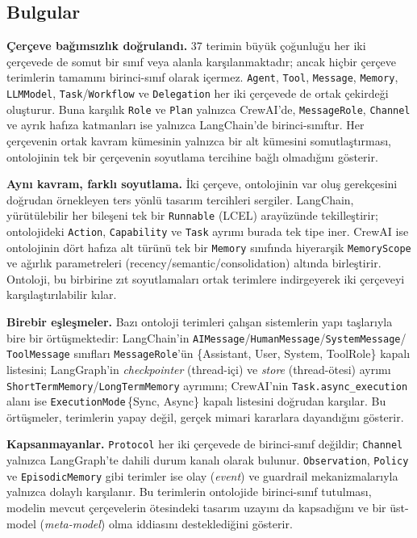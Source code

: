 \documentclass[10pt, a4paper, twocolumn]{article}
\begin{document}
\subsection*{Bulgular}

\textbf{Çerçeve bağımsızlık doğrulandı.} 37 terimin büyük çoğunluğu her iki çerçevede de somut bir sınıf veya alanla karşılanmaktadır; ancak hiçbir çerçeve terimlerin tamamını birinci-sınıf olarak içermez. \texttt{Agent}, \texttt{Tool}, \texttt{Message}, \texttt{Memory}, \texttt{LLMModel}, \texttt{Task}/\texttt{Workflow} ve \texttt{Delegation} her iki çerçevede de ortak çekirdeği oluşturur. Buna karşılık \texttt{Role} ve \texttt{Plan} yalnızca CrewAI'de, \texttt{MessageRole}, \texttt{Channel} ve ayrık hafıza katmanları ise yalnızca LangChain'de birinci-sınıftır. Her çerçevenin ortak kavram kümesinin yalnızca bir alt kümesini somutlaştırması, ontolojinin tek bir çerçevenin soyutlama tercihine bağlı olmadığını gösterir.

\textbf{Aynı kavram, farklı soyutlama.} İki çerçeve, ontolojinin var oluş gerekçesini doğrudan örnekleyen ters yönlü tasarım tercihleri sergiler. LangChain, yürütülebilir her bileşeni tek bir \texttt{Runnable} (LCEL) arayüzünde tekilleştirir; ontolojideki \texttt{Action}, \texttt{Capability} ve \texttt{Task} ayrımı burada tek tipe iner. CrewAI ise ontolojinin dört hafıza alt türünü tek bir \texttt{Memory} sınıfında hiyerarşik \texttt{MemoryScope} ve ağırlık parametreleri (recency/semantic/consolidation) altında birleştirir. Ontoloji, bu birbirine zıt soyutlamaları ortak terimlere indirgeyerek iki çerçeveyi karşılaştırılabilir kılar.

\textbf{Birebir eşleşmeler.} Bazı ontoloji terimleri çalışan sistemlerin yapı taşlarıyla bire bir örtüşmektedir: LangChain'in \texttt{AIMessage}/\texttt{HumanMessage}/\texttt{SystemMessage}/ \texttt{ToolMessage} sınıfları \texttt{MessageRole}'ün \{Assistant, User, System, ToolRole\} kapalı listesini; LangGraph'in \textit{checkpointer} (thread-içi) ve \textit{store} (thread-ötesi) ayrımı \texttt{ShortTermMemory}/\texttt{LongTermMemory} ayrımını; CrewAI'nin \texttt{Task.async\_execution} alanı ise \texttt{ExecutionMode}\,\{Sync, Async\} kapalı listesini doğrudan karşılar. Bu örtüşmeler, terimlerin yapay değil, gerçek mimari kararlara dayandığını gösterir.

\textbf{Kapsanmayanlar.} \texttt{Protocol} her iki çerçevede de birinci-sınıf değildir; \texttt{Channel} yalnızca LangGraph'te dahili durum kanalı olarak bulunur. \texttt{Observation}, \texttt{Policy} ve \texttt{EpisodicMemory} gibi terimler ise olay (\textit{event}) ve guardrail mekanizmalarıyla yalnızca dolaylı karşılanır. Bu terimlerin ontolojide birinci-sınıf tutulması, modelin mevcut çerçevelerin ötesindeki tasarım uzayını da kapsadığını ve bir üst-model (\textit{meta-model}) olma iddiasını desteklediğini gösterir.
\end{document}
